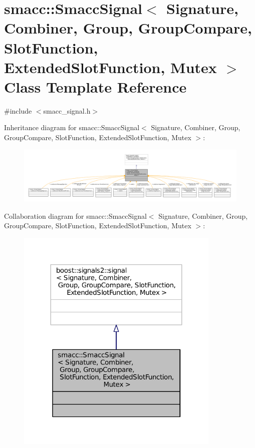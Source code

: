 \hypertarget{classsmacc_1_1SmaccSignal}{}\section{smacc\+:\+:Smacc\+Signal$<$ Signature, Combiner, Group, Group\+Compare, Slot\+Function, Extended\+Slot\+Function, Mutex $>$ Class Template Reference}
\label{classsmacc_1_1SmaccSignal}


{\ttfamily \#include $<$smacc\+\_\+signal.\+h$>$}



Inheritance diagram for smacc\+:\+:Smacc\+Signal$<$ Signature, Combiner, Group, Group\+Compare, Slot\+Function, Extended\+Slot\+Function, Mutex $>$\+:
\nopagebreak
\begin{figure}[H]
\begin{center}
\leavevmode
\includegraphics[width=350pt]{classsmacc_1_1SmaccSignal__inherit__graph}
\end{center}
\end{figure}


Collaboration diagram for smacc\+:\+:Smacc\+Signal$<$ Signature, Combiner, Group, Group\+Compare, Slot\+Function, Extended\+Slot\+Function, Mutex $>$\+:
\nopagebreak
\begin{figure}[H]
\begin{center}
\leavevmode
\includegraphics[width=276pt]{classsmacc_1_1SmaccSignal__coll__graph}
\end{center}
\end{figure}


